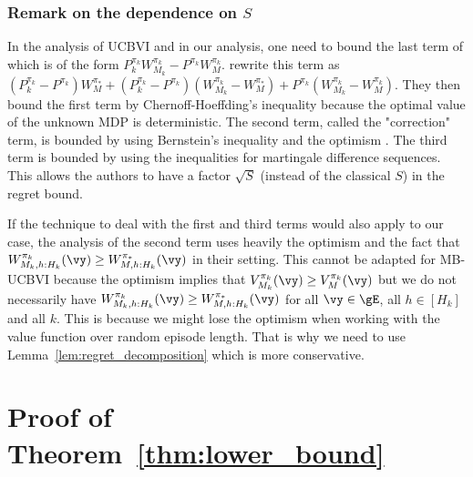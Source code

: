 \subsubsection{Remark on the dependence on $S$}
\label{sssec:ucbvi_s}

In the analysis of UCBVI and in our analysis, one need to bound the last term of 
which is of the form ${P_k^{\pi_k}W^{\pi_k}_{M_k} -P^{\pi_k}W^{\pi_k}_{M}}$. \cite{azar2017minimax} rewrite this term as
$(P_k^{\pi_k} -P^{\pi_k})W^{\pi_*}_M +(P_k^{\pi_k} -P^{\pi_k})(W^{\pi_k}_{M_k} -W^{\pi_*}_M) +P^{\pi_k}(W^{\pi_k}_{M_k} {-}W^{\pi_k}_{M})$.
They then bound the first term by Chernoff-Hoeffding's inequality because the optimal value of the unknown MDP is deterministic.
The second term, called the "correction" term, is bounded by using Bernstein's inequality and the optimism \cite[Step 1, page 6]{azar2017minimax}. The third term is bounded by using the inequalities for martingale difference sequences. This allows the authors to have a factor $\sqrt{S}$ (instead of the classical $S$) in the regret bound.

If the technique to deal with the first and third terms would also apply to our case, the analysis of the second term uses heavily the optimism and the fact that $W^{\pi_k}_{M_k,h:H_k}(\vy)\ge W^{\pi_*}_{M,h:H_k}(\vy)$ in their setting. This cannot be adapted for MB-UCBVI because the optimism implies that $V^{\pi_k}_{M_k}(\vy) \ge V^{\pi_k}_{M}(\vy)$ but we do not necessarily have $W^{\pi_k}_{M_k,h:H_k}(\vy)\ge W^{\pi_*}_{M,h:H_k}(\vy)$ for all $\vy\in\gE$, all $h\in[H_k]$ and all $k$.  This is because we might lose the optimism when working with the value function over random episode length.
That is why we need to use Lemma~\ref{lem:regret_decomposition} which is more conservative.

\section{Proof of Theorem~\ref{thm:lower_bound}}
\label{apx:sketch_of_proof_lower}

